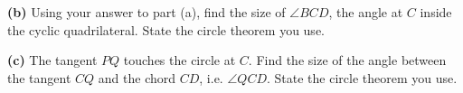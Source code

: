 \begin{question}
\vspace{3.5cm}

\noindent \textbf{(b)} Using your answer to part (a), find the size of $\angle BCD$, the angle at $C$ inside the cyclic quadrilateral. State the circle theorem you use.

\vspace{3cm}

\noindent \textbf{(c)} The tangent $PQ$ touches the circle at $C$. Find the size of the angle between the tangent $CQ$ and the chord $CD$, i.e. $\angle QCD$. State the circle theorem you use.

\vspace{3cm}

\end{question}
